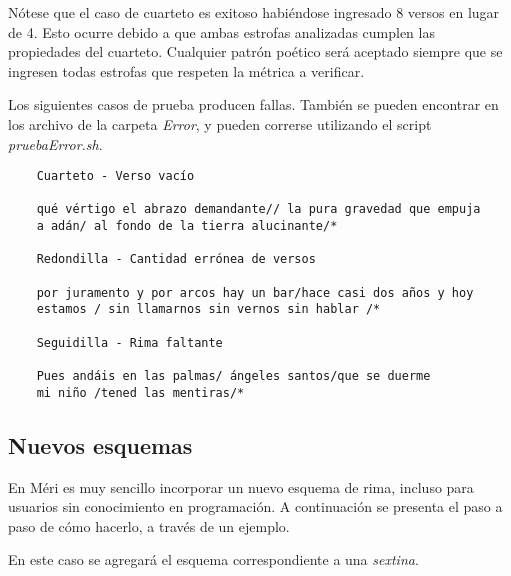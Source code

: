 \documentclass[12pt, a4paper]{article}
\begin{document}
Nótese que el caso de cuarteto es exitoso habiéndose ingresado 8 versos en lugar de 4. Esto ocurre debido a que ambas estrofas analizadas cumplen las propiedades del cuarteto. Cualquier patrón poético será aceptado siempre que se ingresen todas estrofas que respeten la métrica a verificar.

\bigskip

Los siguientes casos de prueba producen fallas. También se pueden encontrar en los archivo de la carpeta \textit{Error}, y pueden correrse utilizando el script \textit{pruebaError.sh}.

\begin{verbatim}
    Cuarteto - Verso vacío
    
    qué vértigo el abrazo demandante// la pura gravedad que empuja
    a adán/ al fondo de la tierra alucinante/*
    
    Redondilla - Cantidad errónea de versos
    
    por juramento y por arcos hay un bar/hace casi dos años y hoy 
    estamos / sin llamarnos sin vernos sin hablar /* 
    
    Seguidilla - Rima faltante
    
    Pues andáis en las palmas/ ángeles santos/que se duerme 
    mi niño /tened las mentiras/*
\end{verbatim}
\subsection*{Nuevos esquemas}
En Méri es muy sencillo incorporar un nuevo esquema de rima, incluso para usuarios sin conocimiento en programación. A continuación se presenta el paso a paso de cómo hacerlo, a través de un ejemplo.

\medskip
En este caso se agregará el esquema correspondiente a una \textit{sextina}.
\end{document}
